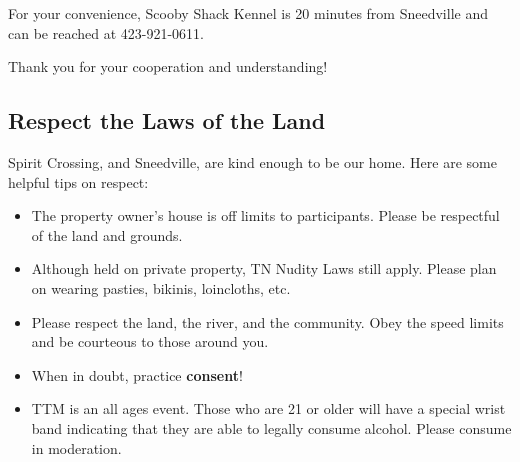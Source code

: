 

For your convenience, Scooby Shack Kennel is 20 minutes from Sneedville and can be reached at 423-921-0611.

Thank you for your cooperation and understanding!


\subsection*{Respect the Laws of the Land}
Spirit Crossing, and Sneedville, are kind enough to be our home.  Here are some helpful tips on respect:
\begin{itemize}[noitemsep]
\item The property owner's house is off limits to participants.  Please be respectful of the land and grounds.
\item Although held on private property, TN Nudity Laws still apply. Please plan on wearing pasties, bikinis, loincloths, etc.
\item Please respect the land, the river, and the community.  Obey the speed limits and be courteous to those around you.
\item When in doubt, practice \textbf{consent}!
\item TTM  is an all ages event.  Those who are 21 or older will have a special wrist band indicating that they are able to legally consume alcohol. Please consume in moderation.
\end{itemize}
    
